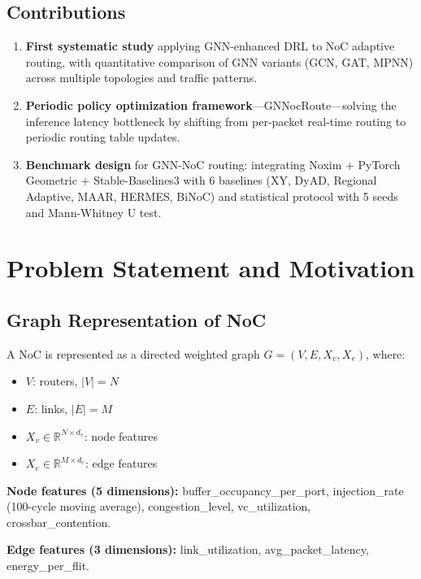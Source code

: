 \documentclass[conference]{IEEEtran}
\begin{document}
\subsection{Contributions}
\label{sec:contributions}

\begin{enumerate}
 \item \textbf{First systematic study} applying GNN-enhanced DRL to NoC adaptive routing, with quantitative comparison of GNN variants (GCN, GAT, MPNN) across multiple topologies and traffic patterns.
 \item \textbf{Periodic policy optimization framework}---GNNocRoute---solving the inference latency bottleneck by shifting from per-packet real-time routing to periodic routing table updates.
 \item \textbf{Benchmark design} for GNN-NoC routing: integrating Noxim + PyTorch Geometric + Stable-Baselines3 with 6 baselines (XY, DyAD, Regional Adaptive, MAAR, HERMES, BiNoC) and statistical protocol with 5 seeds and Mann-Whitney U test.
\end{enumerate}

\section{Problem Statement and Motivation}
\label{sec:problem}

\subsection{Graph Representation of NoC}

A NoC is represented as a directed weighted graph $G=(V,E,X_v,X_e)$, where:
\begin{itemize}
 \item $V$: routers, $|V|=N$
 \item $E$: links, $|E|=M$
 \item $X_v\in\mathbb{R}^{N\times d_v}$: node features
 \item $X_e\in\mathbb{R}^{M\times d_e}$: edge features
\end{itemize}

\textbf{Node features (5 dimensions):} buffer\_occupancy\_per\_port, injection\_rate (100-cycle moving average), congestion\_level, vc\_utilization, crossbar\_contention.

\textbf{Edge features (3 dimensions):} link\_utilization, avg\_packet\_latency, energy\_per\_flit.
\end{document}
